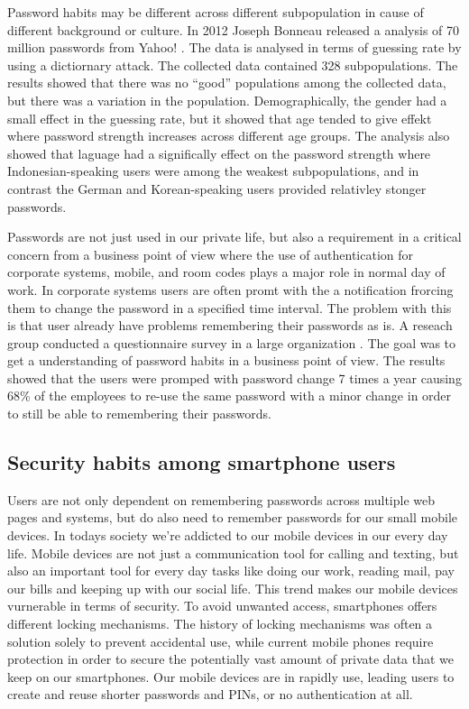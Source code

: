     Password habits may be different across different subpopulation in cause of different background or culture. In 2012 Joseph Bonneau released a analysis of 70 million passwords from Yahoo! \cite{Bonneau2}. The data is analysed in terms of guessing rate by using a dictiornary attack. The collected data contained 328 subpopulations. The results showed that there was no ``good'' populations among the collected data, but there was a variation in the population. Demographically, the gender had a small effect in the guessing rate, but it showed that age tended to give effekt where password strength increases across different age groups. The analysis also showed that laguage had a significally effect on the password strength where Indonesian-speaking users were among the weakest subpopulations, and in contrast the German and Korean-speaking users provided relativley stonger passwords. 

    Passwords are not just used in our private life, but also a requirement in a critical concern from a business point of view where the use of authentication for corporate systems, mobile, and room codes plays a major role in normal day of work. In corporate systems users are often promt with the a notification frorcing them to change the password in a specified time interval. The problem with this is that user already have problems remembering their passwords as is. A reseach group conducted a questionnaire survey in a large organization \cite{habits2}. The goal was to get a understanding of password habits in a business point of view. The results showed that the users were promped with password change 7 times a year causing 68\% of the employees to re-use the same password with a minor change in order to still be able to remembering their passwords.

    \subsection{Security habits among smartphone users}

    Users are not only dependent on remembering passwords across multiple web pages and systems, but do also need to remember passwords for our small mobile devices. In todays society we're addicted to our mobile devices in our every day life. Mobile devices are not just a communication tool for calling and texting, but also an important tool for every day tasks like doing our work, reading mail, pay our bills and keeping up with our social life. This trend makes our mobile devices vurnerable in terms of security. To avoid unwanted access, smartphones offers different locking mechanisms. The history of locking mechanisms was often a solution solely to prevent accidental use, while current mobile phones require protection in order to secure the potentially vast amount of private data that we keep on our smartphones. Our mobile devices are in rapidly use, leading users to create and reuse shorter passwords and PINs, or no authentication at all. 

